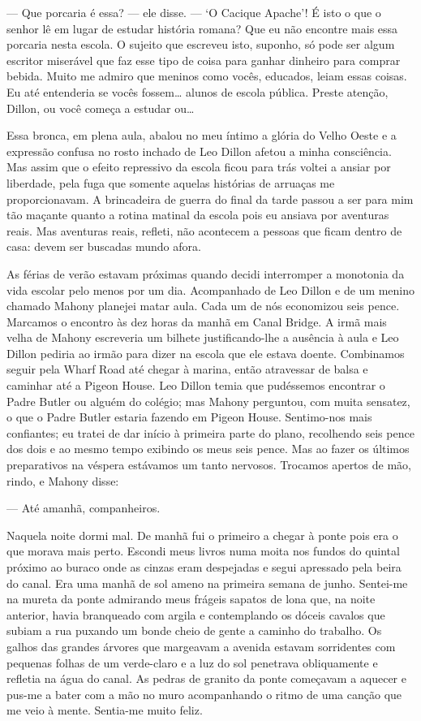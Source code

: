 --- Que porcaria é essa? --- ele disse. --- `O Cacique Apache'! É
isto o que o senhor lê em lugar de estudar história romana? Que eu não
encontre mais essa porcaria nesta escola. O sujeito que escreveu isto,
suponho, só pode ser algum escritor miserável que faz esse tipo de
coisa para ganhar dinheiro para comprar bebida. Muito me admiro que
meninos como vocês, educados, leiam essas coisas. Eu até entenderia se
vocês fossem\ldots{} alunos de escola pública. Preste atenção, Dillon, ou
você começa a estudar ou\ldots{}

Essa bronca, em plena aula, abalou no meu íntimo a glória do Velho
Oeste e a expressão confusa no rosto inchado de Leo Dillon afetou a
minha consciência. Mas assim que o efeito repressivo da escola ficou
para trás voltei a ansiar por liberdade, pela fuga que somente aquelas
histórias de arruaças me proporcionavam. A brincadeira de guerra do
final da tarde passou a ser para mim tão maçante quanto a rotina
matinal da escola pois eu ansiava por
aventuras reais. Mas aventuras reais, refleti, não acontecem a
pessoas que ficam dentro de casa: devem ser buscadas mundo afora.

As férias de verão estavam próximas quando decidi interromper a
monotonia da vida escolar pelo menos por um dia. Acompanhado de Leo
Dillon e de um menino chamado Mahony planejei matar aula. Cada um de
nós economizou seis pence. Marcamos o encontro às dez horas da manhã
em Canal Bridge. A irmã mais velha de Mahony escreveria um bilhete
justificando-lhe a ausência à aula e Leo Dillon pediria ao irmão
para dizer na escola que ele estava doente. Combinamos seguir pela
Wharf Road até chegar à marina, então atravessar de balsa e caminhar
até a Pigeon House. Leo Dillon temia que pudéssemos encontrar o Padre
Butler ou alguém do colégio; mas Mahony perguntou, com muita
sensatez, o que o Padre Butler estaria fazendo em Pigeon House.
Sentimo-nos mais confiantes; eu tratei de dar início à primeira parte
do plano, recolhendo seis pence dos dois e ao mesmo tempo exibindo os
meus seis pence. Mas ao fazer os últimos preparativos na véspera
estávamos um tanto nervosos. Trocamos apertos de mão, rindo, e Mahony
disse:

--- Até amanhã, companheiros.

Naquela noite dormi mal. De manhã fui o primeiro a chegar à ponte pois
era o que morava mais perto. Escondi meus livros numa moita nos fundos
do quintal próximo ao buraco onde as cinzas eram despejadas e segui
apressado pela beira do canal. Era uma manhã de sol ameno na primeira
semana de junho. Sentei-me na mureta da ponte admirando meus frágeis
sapatos de lona que, na noite anterior, havia branqueado com argila e
contemplando os dóceis cavalos que subiam a rua puxando um bonde cheio
de gente a caminho do trabalho. Os galhos das grandes árvores que
margeavam a avenida estavam sorridentes com pequenas folhas de um
verde-claro e a luz do sol penetrava obliquamente e refletia na água
do canal. As pedras de granito da ponte começavam a aquecer e pus-me a
bater com a mão no muro acompanhando o ritmo de uma canção que me veio
à mente. Sentia-me muito feliz.


